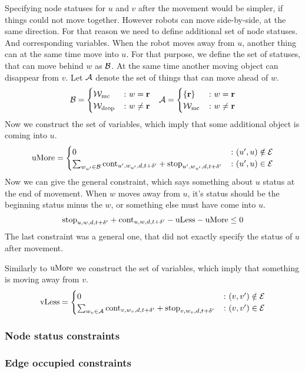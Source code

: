 Specifying node statuses for $u$ and $v$ after the movement would be simpler,
if things could not move together. However robots can move side-by-side, at the
same direction. For that reason we need to define additional set of node
statuses. And corresponding variables. When the robot moves away from $u$,
another thing can at the same time move into $u$. For that purpose, we define
the set of statuses, that can move behind $w$ as $\mathcal{B}$. At the same time another
moving object can disappear from $v$. Let $\mathcal{A}$ denote the set of things that
can move ahead of $w$.
\begin{align}
    &\mathcal{B} = \begin{cases}
        \mathcal{W}_\mathrm{mc} &\colon w = \text{\bf r}\\
        \mathcal{W}_\mathrm{drop} &\colon w \neq \text{\bf r}
    \end{cases}
    &\mathcal{A} = \begin{cases}
        \{\text{\bf r}\} &\colon w = \text{\bf r}\\
        \mathcal{W}_\mathrm{mc} &\colon w \neq \text{\bf r}
    \end{cases}
\end{align}
Now we construct the set of variables, which imply that some additional object
is coming into $u$.
\begin{align}
    \mathrm{uMore} = \begin{cases}
        0 &\colon (u',u) \notin \mathcal{E}\\
        \sum_{w_{u'} \in \mathcal{B}} \mathrm{cont}_{u',w_{u'},d,t+\delta'} +
        \mathrm{stop}_{u',w_{u'},d,t+\delta'} &\colon (u',u) \in \mathcal{E}
    \end{cases}
\end{align}
Now we can give the general constraint, which says something about $u$ status
at the end of movement. When $w$ moves away from $u$, it's status should be the
beginning status minus the $w$, or something else must have come into $u$.
\begin{align}
    \mathrm{stop}_{u,w,d,t+\delta'} + \mathrm{cont}_{u,w,d,t+\delta'} - \mathrm{uLess} -\mathrm{uMore} \leq 0
\end{align}
The last constraint was a general one, that did not exactly specify the status
of $u$ after movement.

Similarly to $\mathrm{uMore}$ we construct the set of variables, which imply that something is
moving away from $v$.
\begin{align}
    \mathrm{vLess} = \begin{cases}
        0 &\colon (v,v') \notin \mathcal{E}\\
        \sum_{w_v \in \mathcal{A}} \mathrm{cont}_{v,w_v,d,t+\delta'} +
        \mathrm{stop}_{v,w_v,d,t+\delta'} &\colon (v,v') \in \mathcal{E}
    \end{cases}
\end{align}
\subsubsection{Node status constraints}
\subsubsection{Edge occupied constraints}
